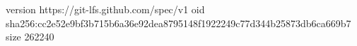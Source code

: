 version https://git-lfs.github.com/spec/v1
oid sha256:cc2e52e9bf3b715b6a36e92dea8795148f1922249c77d344b25873db6ca669b7
size 262240
